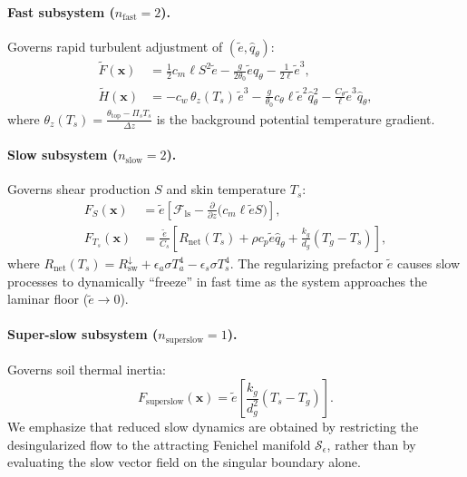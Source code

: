 \paragraph{Fast subsystem ($n_{\mathrm{fast}} = 2$).}
Governs rapid turbulent adjustment of $(\tilde e, \hat q_\theta)$:
\begin{align}
\tilde F(\mathbf{x}) &= \frac{1}{2} c_m \ell S^2 \tilde e - \frac{g}{2\theta_0} \tilde e \hat q_\theta - \frac{1}{2\ell} \tilde e^3, \\
\tilde H(\mathbf{x}) &= - c_w \, \theta_z(T_s) \, \tilde e^3 - \frac{g}{\theta_0} c_\theta \ell \tilde e^2 \hat q_\theta^2 - \frac{C_\theta}{\ell} \tilde e^3 \hat q_\theta,
\end{align}
where $\theta_z(T_s) = \frac{\theta_{\mathrm{top}} - \Pi_s T_s}{\Delta z}$ is the background potential temperature gradient.

\paragraph{Slow subsystem ($n_{\mathrm{slow}} = 2$).}
Governs shear production $S$ and skin temperature $T_s$:
\begin{align}
F_S(\mathbf{x}) &= \tilde e \left[ \mathcal{F}_{\mathrm{ls}} - \frac{\partial}{\partial z}\big(c_m \ell \tilde e S\big) \right], \\
F_{T_s}(\mathbf{x}) &= \frac{\tilde e}{C_s} \left[ R_{\mathrm{net}}(T_s) + \rho c_p \tilde e \hat q_\theta + \frac{k_g}{d_g}(T_g - T_s) \right],
\end{align}
where $R_{\mathrm{net}}(T_s) = R_{\mathrm{sw}}^{\downarrow} + \epsilon_a \sigma T_a^4 - \epsilon_s \sigma T_s^4$. The regularizing prefactor $\tilde e$ causes slow processes to dynamically ``freeze'' in fast time as the system approaches the laminar floor ($\tilde e \to 0$).

\paragraph{Super-slow subsystem ($n_{\mathrm{superslow}} = 1$).}
Governs soil thermal inertia:
\begin{equation}
F_{\mathrm{superslow}}(\mathbf{x}) = \tilde e \left[ \frac{k_g}{d_g^2}(T_s - T_g) \right].
\end{equation}
We emphasize that reduced slow dynamics are obtained by restricting the desingularized flow to the attracting Fenichel manifold $\mathcal{S}_\epsilon$, rather than by evaluating the slow vector field on the singular boundary alone.

